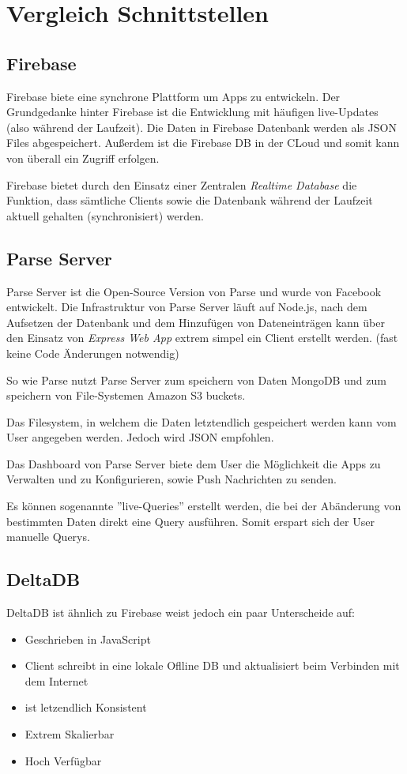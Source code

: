 \section{Vergleich Schnittstellen}
\subsection{Firebase}
Firebase biete eine synchrone Plattform um Apps zu entwickeln. Der Grundgedanke hinter Firebase ist die Entwicklung mit häufigen live-Updates (also während der Laufzeit). Die Daten in Firebase Datenbank werden als JSON Files abgespeichert. Außerdem ist die Firebase DB in der CLoud und somit kann von überall ein Zugriff erfolgen.

Firebase bietet durch den Einsatz einer Zentralen \textit{Realtime Database} die Funktion, dass sämtliche Clients sowie die Datenbank während der Laufzeit aktuell gehalten (synchronisiert) werden. 

\subsection{Parse Server}
Parse Server ist die Open-Source Version von Parse und wurde von Facebook entwickelt. Die Infrastruktur von Parse Server läuft auf Node.js, nach dem Aufsetzen der Datenbank und dem Hinzufügen von Dateneinträgen kann über den Einsatz von \textit{Express Web App} extrem simpel ein Client erstellt werden. (fast keine Code Änderungen notwendig)

So wie Parse nutzt Parse Server zum speichern von Daten MongoDB und zum speichern von File-Systemen Amazon S3 buckets.

Das Filesystem, in welchem die Daten letztendlich gespeichert werden kann vom User angegeben werden. Jedoch wird JSON empfohlen.

Das Dashboard von Parse Server biete dem User die Möglichkeit die Apps zu Verwalten und zu Konfigurieren, sowie Push Nachrichten zu senden.

Es können sogenannte ''live-Queries'' erstellt werden, die bei der Abänderung von bestimmten Daten direkt eine Query ausführen. Somit erspart sich der User manuelle Querys.


\subsection{DeltaDB}
DeltaDB ist ähnlich zu Firebase weist jedoch ein paar Unterscheide auf:
\begin{itemize}
	\item Geschrieben in JavaScript
	\item Client schreibt in eine lokale Oflline DB und aktualisiert beim Verbinden mit dem Internet
	\item ist letzendlich Konsistent
	\item Extrem Skalierbar
	\item Hoch Verfügbar
	
\end{itemize}
